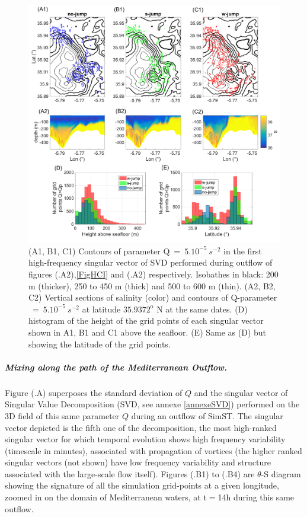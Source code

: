 \begin{figure}[!h]
 \includegraphics[width=\textwidth]{./GBR3D/EOF5_MIV_2D.png}
 \caption[SVD of parameter Q across simulations SimNT, SimIT and SimST.]{(A1, B1, C1) Contours of parameter Q$\ =\ 5.10^{-5} \ s^{-2}$ in the first high-frequency singular vector of SVD performed during outflow of figures (.A2),\ref{FigHCI} and (.A2) respectively. Isobathes in black: 200 m (thicker), 250 to 450 m (thick) and 500 to 600 m (thin). (A2, B2, C2) Vertical sections of salinity (color) and contours of Q-parameter $\ =\ 5.10^{-5}\ s^{-2}$ at latitude $35.9372^\text{o}$ N at the same dates. (D) histogram of the height of the grid points of each singular vector shown in A1, B1 and C1 above the seafloor. (E) Same as (D) but showing the latitude of the grid points.}
 \label{FigEOFMIV}
\end{figure}

\subparagraph{Mixing along the path of the Mediterranean Outflow.}
Figure (.A) superposes the standard deviation of $Q$ and the singular vector of Singular Value Decomposition (SVD, see annexe \ref{annexeSVD}) performed on the 3D field of this same parameter $Q$ during an outflow of SimST. The singular vector depicted is the fifth one of the decomposition, the most high-ranked singular vector for which temporal evolution shows high frequency variability (timescale in minutes), associated with propagation of vortices (the higher ranked singular vectors (not shown) have low frequency variability and structure associated with the large-scale flow itself). Figures (.B1) to (.B4) are $\theta$-S diagram showing the signature of all the simulation grid-points at a given longitude, zoomed in on the domain of Mediterranean waters, at t$=$14h during this same outflow.

